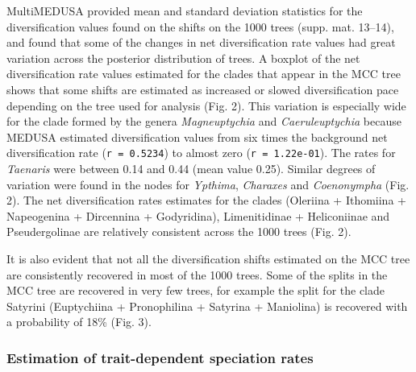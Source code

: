 \documentclass[10pt]{article}
\begin{document}
MultiMEDUSA provided mean and standard deviation statistics for the
diversification values found on the shifts on the 1000 trees (supp. mat.
13--14), and found that some of the changes in net diversification rate
values had great variation across the posterior distribution of trees. A
boxplot of the net diversification rate values estimated for the clades
that appear in the MCC tree shows that some shifts are estimated as
increased or slowed diversification pace depending on the tree used for
analysis (Fig. 2). This variation is especially wide for the clade
formed by the genera \emph{Magneuptychia} and \emph{Caeruleuptychia}
because MEDUSA estimated diversification values from six times the
background net diversification rate (\texttt{r = 0.5234}) to almost zero
(\texttt{r = 1.22e-01}). The rates for \emph{Taenaris} were between 0.14
and 0.44 (mean value 0.25). Similar degrees of variation were found in
the nodes for \emph{Ypthima}, \emph{Charaxes} and \emph{Coenonympha}
(Fig. 2). The net diversification rates estimates for the clades
(Oleriina + Ithomiina + Napeogenina + Dircennina + Godyridina),
Limenitidinae + Heliconiinae and Pseudergolinae are relatively
consistent across the 1000 trees (Fig. 2).

It is also evident that not all the diversification shifts estimated on
the MCC tree are consistently recovered in most of the 1000 trees. Some
of the splits in the MCC tree are recovered in very few trees, for
example the split for the clade Satyrini (Euptychiina + Pronophilina +
Satyrina + Maniolina) is recovered with a probability of 18\% (Fig. 3).

\subsubsection{Estimation of trait-dependent speciation
rates}\label{estimation-of-trait-dependent-speciation-rates-1}
\end{document}
